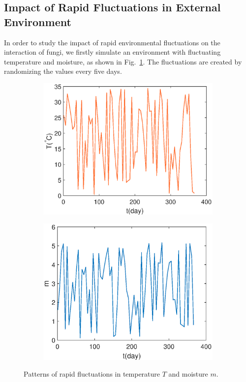 \documentclass[a4paper,12pt]{article}
\begin{document}
\subsection{Impact of Rapid Fluctuations in External Environment}
In order to study the impact of rapid environmental fluctuations on the interaction of fungi, we firstly simulate an environment with fluctuating temperature and moisture, as shown in Fig.~\ref{fluctuation}. The fluctuations are created by randomizing the values every five days.
\begin{figure}[H]
	\centering
	\begin{subfigure}{0.42\textwidth}
		\includegraphics[width=\textwidth]{./4/T_fluc.eps}
	\end{subfigure}
	\begin{subfigure}{0.42\textwidth}
		\includegraphics[width=\textwidth]{./4/m_fluc.eps}
	\end{subfigure}
	\caption{Patterns of rapid fluctuations in temperature $T$ and moisture $m$.}
	\label{fluctuation}
\end{figure}
\end{document}
